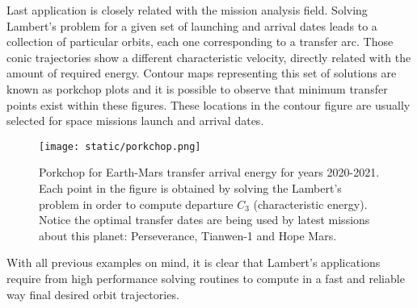 Last application is closely related with the mission analysis field. Solving
Lambert's problem for a given set of launching and arrival dates leads to a
collection of particular orbits, each one corresponding to a transfer arc.
Those conic trajectories show a different characteristic velocity, directly
related with the amount of required energy.  Contour maps representing this set
of solutions are known as porkchop plots and it is possible to observe that minimum
transfer points exist within these figures.  These locations in the contour
figure are usually selected for space missions launch and arrival dates.

\begin{figure}[h]
  \centering
  \texttt{[image: static/porkchop.png]}
  \caption{Porkchop for Earth-Mars transfer arrival energy for years 2020-2021.
    Each point in the figure is obtained by solving the Lambert's problem in order
    to compute departure $C_{3}$ (characteristic energy). Notice the optimal
    transfer dates are being used by latest missions about this planet: Perseverance,
    Tianwen-1 and Hope Mars.}
  \label{fig:porkchop_perseverance}
\end{figure}

With all previous examples on mind, it is clear that Lambert's applications
require from high performance solving routines to compute in a fast and reliable
way final desired orbit trajectories.
